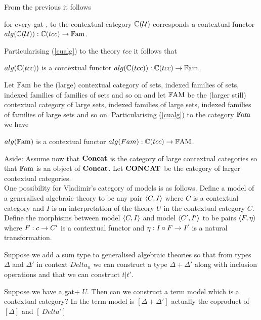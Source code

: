 \begin{oldtt}
\note
From the previous it follows 
\begin{pointeq}
\label{cualg}
for every gat \gat[U], to the contextual category $\CofU$ corresponds a contextual functor
   $\alg{\CofU} :\ccat[C](tcc) \morph \Fam$. \\
\end{pointeq} 

\note Particularising (\ref{cualg}) to the theory $tcc$ it follows that
\begin{pointeq}
  $\alg{\ccat[C](tcc)}$ is a contextual functor   $\alg{\ccat[C](tcc)} :\ccat[C](tcc) \morph \Fam$.
\end{pointeq}

\note
Let $\Fam$ be the (large) contextual category of sets, indexed families of sets, indexed families of families of sets and so on and
let $\FAM$ be the (larger still) contextual category of large sets, indexed families of large sets, indexed families of families of large sets and so on.
Particularising (\ref{cualg}) to the category $\Fam$ we have
\begin{pointeq}
  \label{inducedalgebra}
  $\alg{\Fam}$ is a contextual functor   $\alg{Fam} :\ccat[C](tcc) \morph \FAM$. 
\end{pointeq}
 
\note
Aside: Assume now that $\catofccs$ is the category of large contextual categories so that $\Fam$ is an object of $\catofccs$. 
Let $\catoflargerccs$ be the category of larger contextual categories. \\

\note
One possibility for Vladimir's category of models is as follows. Define a model of a generalised algebraic theory to be any pair $\tuple{C,I}$ where $C$ is a contextual category and $I$ is an interpretation of the theory $U$ in the contextual category $C$. Define the morphisms between
model $\tuple{C,I}$ and model $\tuple{C',I'}$ to be pairs $\tuple{F, \eta}$ where
$F: c \morph C'$ is a contextual functor and $\eta: I \circ F \morph  I'$ is a natural transformation.

\note Suppose we add a sum type to generalised algebraic theories so that from
types $\Delta$ and $\Delta'$ in context $Delta_n$ we can construct a type $\Delta + \Delta'$
along with inclusion operations and that we can construct $t | t'$. 

\note Suppose we have a gat+ $U$. Then can we construct a term model which is a contextual category?
In the term model is $[\Delta + \Delta']$ actually the coproduct of $[\Delta]$ and $[\
Delta'] $
\end{oldtt}